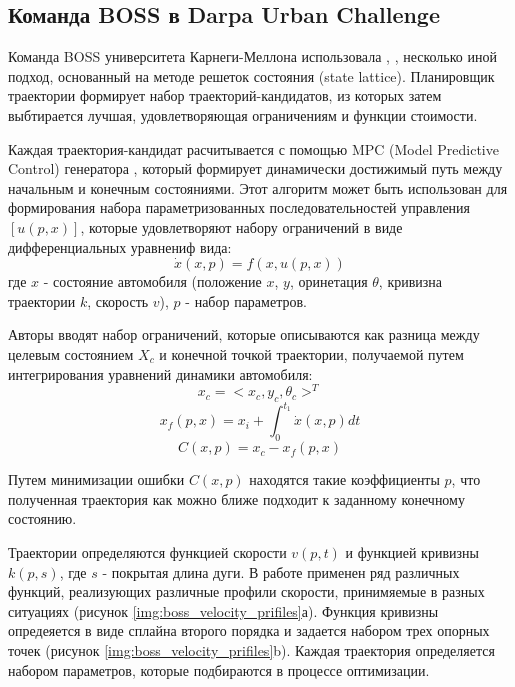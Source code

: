 \subsection{Команда BOSS в Darpa Urban Challenge}
Команда BOSS университета  Карнеги-Меллона использовала \cite{darpa_boss}, \cite{darpa_boss_2}, \cite{darpa_boss_3}
несколько иной подход, основанный на методе решеток состояния (state lattice). Планировщик траектории формирует набор
траекторий-кандидатов, из которых затем выбтирается лучшая, удовлетворяющая ограничениям и функции стоимости.

Каждая траектория-кандидат расчитывается с помощью MPC (Model Predictive Control) генератора \cite{darpa_boss_kelly},
который формирует динамически достижимый путь между начальным и конечным состояниями. Этот алгоритм может быть
использован для формирования набора параметризованных последовательностей управления $[u(p,x)]$, которые удовлетворяют
набору ограничений в виде дифференциальных уравнениф вида:
\begin{equation}
\dot{x}(x, p) = f(x, u(p,x))
\end{equation}
где $x$ - состояние автомобиля
(положение $x$, $y$, оринетация $\theta$, кривизна траектории $k$, скорость $v$), $p$ - набор параметров.

Авторы вводят набор ограничений, которые описываются как разница между целевым состоянием $X_c$ и конечной точкой траектории,
получаемой путем интегрирования уравнений динамики автомобиля:
\begin{equation}
    x_c = <x_c, y_c, \theta_c>^T
\end{equation}
\begin{equation}
    x_f(p,x) = x_{i} + \int_0^{t_1}{\dot{x}(x, p)dt}
\end{equation}
\begin{equation}
    C(x, p) = x_c - x_f(p,x)
\end{equation}

Путем минимизации ошибки $C(x, p)$ находятся такие коэффициенты $p$, что полученная траектория как можно ближе подходит
к заданному конечному состоянию.

Траектории определяются функцией скорости $v(p, t)$ и функцией кривизны $k(p, s)$, где $s$ - покрытая длина дуги. В работе
применен ряд различных функций, реализующих различные профили скорости, принимяемые в разных ситуациях
(рисунок \ref{img:boss_velocity_prifiles}а). Функция кривизны опредеяется в виде сплайна второго порядка и задается
набором трех опорных точек (рисунок \ref{img:boss_velocity_prifiles}b). Каждая траектория определяется набором
параметров, которые подбираются в процессе оптимизации.

